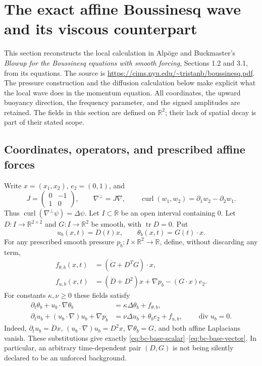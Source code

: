 \section{The exact affine Boussinesq wave and its viscous counterpart}
\label{sec:boussinesq-core}

This section reconstructs the local calculation in Alp\"oge and Buckmaster's
\emph{Blowup for the Boussinesq equations with smooth forcing}, Sections 1.2
and 3.1, from its equations. The source is
\url{https://cims.nyu.edu/~tristanb/boussinesq.pdf}.
The pressure construction and the diffusion calculation below make explicit
what the local wave does in the momentum equation. All coordinates, the
upward buoyancy direction, the frequency parameter, and the signed
amplitudes are retained. The fields in this section are defined on
$\mathbb R^2$; their lack of spatial decay is part of their stated scope.

\subsection{Coordinates, operators, and prescribed affine forces}

Write $x=(x_1,x_2)$, $e_2=(0,1)$, and
\[
J=\begin{pmatrix}0&-1\\1&0\end{pmatrix},\qquad
\nabla^\perp=J\nabla,\qquad
\operatorname{curl}(w_1,w_2)=\partial_1w_2-\partial_2w_1.
\]
Thus $\operatorname{curl}(\nabla^\perp\psi)=\Delta\psi$.
Let $I\subset\mathbb R$ be an open interval containing $0$.
Let $D:I\to\mathbb R^{2\times2}$ and $G:I\to\mathbb R^2$ be smooth,
with $\operatorname{tr}D=0$. Put
\[
u_b(x,t)=D(t)x,\qquad \theta_b(x,t)=G(t)\cdot x.
\]
For any prescribed smooth pressure $p_b:I\times\mathbb R^2\to\mathbb R$,
define, without discarding any term,
\begin{align}
f_{\theta,b}(x,t)&=(\dot G+D^TG)\cdot x,\label{eq:bc-base-scalar}\\
f_{u,b}(x,t)&=(\dot D+D^2)x+\nabla p_b-(G\cdot x)e_2.
\label{eq:bc-base-vector}
\end{align}
For constants $\kappa,\nu\geq0$ these fields satisfy
\begin{align}
\partial_t\theta_b+u_b\cdot\nabla\theta_b
 &=\kappa\Delta\theta_b+f_{\theta,b},\label{eq:bc-scalar-pde}\\
\partial_tu_b+(u_b\cdot\nabla)u_b+\nabla p_b
 &=\nu\Delta u_b+\theta_be_2+f_{u,b},\qquad
\operatorname{div}u_b=0. \label{eq:bc-momentum-pde}
\end{align}
Indeed, $\partial_tu_b=\dot D x$, $(u_b\cdot\nabla)u_b=D^2x$,
$\nabla\theta_b=G$, and both affine Laplacians vanish. These substitutions
give exactly \eqref{eq:bc-base-scalar}--\eqref{eq:bc-base-vector}.
In particular, an arbitrary time-dependent pair $(D,G)$ is not being
silently declared to be an unforced background.

